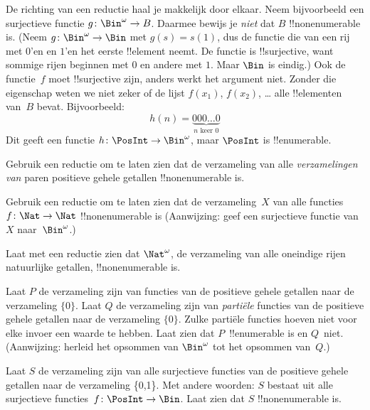 \documentclass[openany]{memoir}
\begin{document}
\begin{explain}
De richting van een reductie haal je makkelijk door elkaar. Neem
bijvoorbeeld een surjectieve functie $g \colon \Bin^\omega \to B$.
Daarmee bewijs je \emph{niet} dat $B$ !!{nonenumerable} is. (Neem $g
\colon \Bin^\omega \to \Bin$ met $g(s) = s(1)$, dus de functie die van
een rij met $0$'en en $1$'en het eerste !!{element} neemt. De functie
is !!{surjective}, want sommige rijen beginnen met $0$ en andere met
$1$. Maar $\Bin$ is eindig.) Ook de functie~$f$ moet !!{surjective}
zijn, anders werkt het argument niet. Zonder die eigenschap weten we
niet zeker of de lijst $f(x_1)$, $f(x_2)$, \dots{} alle
!!{element}en van~$B$ bevat.
Bijvoorbeeld:
\[
h(n) = \underbrace{000\dots0}_{\text{$n$ keer $0$}}
\]
Dit geeft een functie $h\colon \PosInt \to
\Bin^\omega$, maar $\PosInt$ is !!{enumerable}.
\end{explain}

\begin{prob}
Gebruik een reductie om te laten zien dat de verzameling van alle
\emph{verzamelingen van} paren positieve gehele getallen
!!{nonenumerable} is.
\end{prob}

\begin{prob}\label{sfr:siz:red:prob:nat-nat}
  Gebruik een reductie om te laten zien dat de verzameling~$X$ van alle
  functies $f\colon \Nat \to \Nat$ !!{nonenumerable} is (Aanwijzing:
  geef een surjectieve functie van $X$ naar~$\Bin^\omega$.)
\end{prob}

\begin{prob}
Laat met een reductie zien dat $\Nat^\omega$, de verzameling van alle
oneindige rijen natuurlijke getallen, !!{nonenumerable} is.
\end{prob}

\begin{prob}
Laat $P$ de verzameling zijn van functies van de positieve gehele
getallen naar de verzameling $\{0\}$. Laat $Q$ de verzameling zijn van
\emph{partiële} functies van de positieve gehele getallen naar de
verzameling $\{0\}$. Zulke partiële functies hoeven niet voor elke
invoer een waarde te hebben. Laat zien dat $P$~!!{enumerable} is en
$Q$~niet. (Aanwijzing: herleid het opsommen van $\Bin^\omega$ tot het
opsommen van~$Q$.)
\end{prob}

\begin{prob}
Laat $S$ de verzameling zijn van alle surjectieve functies van de
positieve gehele getallen naar de verzameling \{0,1\}. Met andere
woorden: $S$ bestaat uit alle surjectieve functies~$f\colon
\PosInt \to \Bin$. Laat zien dat $S$ !!{nonenumerable} is.
\end{prob}
\end{document}
